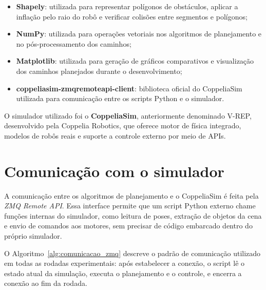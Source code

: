 \begin{itemize}
    \item \textbf{Shapely}: utilizada para representar polígonos de obstáculos, aplicar a inflação pelo raio do robô e verificar colisões entre segmentos e polígonos;

    \item \textbf{NumPy}: utilizada para operações vetoriais nos algoritmos de planejamento e no pós-processamento dos caminhos;

    \item \textbf{Matplotlib}: utilizada para geração de gráficos comparativos e visualização dos caminhos planejados durante o desenvolvimento;

    \item \textbf{coppeliasim-zmqremoteapi-client}: biblioteca oficial do CoppeliaSim utilizada para comunicação entre os scripts Python e o simulador.
\end{itemize}

O simulador utilizado foi o \textbf{CoppeliaSim}, anteriormente denominado V-REP, desenvolvido pela Coppelia Robotics, que oferece motor de física integrado, modelos de robôs reais e suporte a controle externo por meio de APIs.


\section{Comunicação com o simulador}
\label{sec:comunicacao_simulador}

A comunicação entre os algoritmos de planejamento e o CoppeliaSim é feita pela \emph{ZMQ Remote API}. Essa interface permite que um script Python externo chame funções internas do simulador, como leitura de poses, extração de objetos da cena e envio de comandos aos motores, sem precisar de código embarcado dentro do próprio simulador.

O Algoritmo~\ref{alg:comunicacao_zmq} descreve o padrão de comunicação utilizado em todas as rodadas experimentais: após estabelecer a conexão, o script lê o estado atual da simulação, executa o planejamento e o controle, e encerra a conexão ao fim da rodada.

